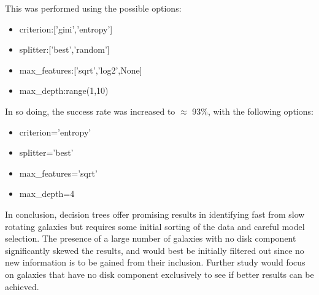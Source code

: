 This was performed using the possible options:
\begin{itemize}
	\item criterion:['gini','entropy']
	\item splitter:['best','random']
	\item max\_features:['sqrt','log2',None]
	\item max\_depth:range(1,10)
\end{itemize}
In so doing, the success rate was increased to $\approx$ 93\%, with the following options:
\begin{itemize}
	\item criterion='entropy'
	\item splitter='best'
	\item max\_features='sqrt'
	\item max\_depth=4
\end{itemize}
In conclusion, decision trees offer promising results in identifying fast from slow rotating galaxies but requires some initial sorting of the data and careful model selection. The presence of a large number of galaxies with no disk component significantly skewed the results, and would best be initially filtered out since no new information is to be gained from their inclusion. Further study would focus on galaxies that have no disk component exclusively to see if better results can be achieved.